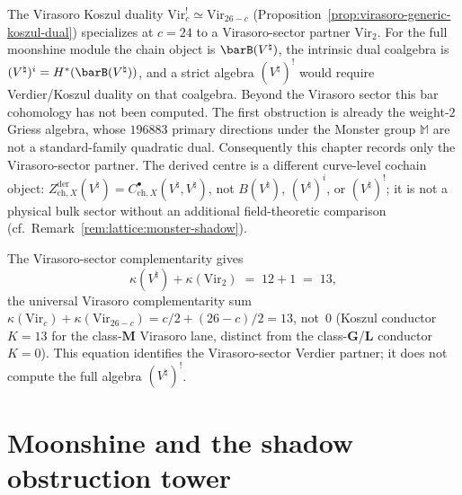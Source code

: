 \begin{remark}%
\label{rem:moonshine-koszul-dual}%
%
The Virasoro Koszul duality $\mathrm{Vir}_c^! \simeq
\mathrm{Vir}_{26-c}$ (Proposition~\ref{prop:virasoro-generic-koszul-dual})
specializes at $c = 24$ to a Virasoro-sector partner
$\mathrm{Vir}_2$. For the full moonshine module the chain object is
$\barB(V^\natural)$, the intrinsic dual coalgebra is
$(V^\natural)^i=H^*(\barB(V^\natural))$, and a strict algebra
$(V^\natural)^!$ would require Verdier/Koszul duality on that
coalgebra. Beyond the Virasoro sector this bar cohomology has not
been computed. The first obstruction is already the weight-$2$
Griess algebra, whose $196883$ primary directions under the Monster
group $\mathbb{M}$ are not a standard-family quadratic dual.
Consequently this chapter records only the Virasoro-sector partner.
The derived centre is a different curve-level cochain object:
$Z_{\mathrm{ch},X}^{\mathrm{der}}(V^\natural)
=C^\bullet_{\mathrm{ch},X}(V^\natural,V^\natural)$, not
$B(V^\natural)$, $(V^\natural)^i$, or $(V^\natural)^!$; it is not a
physical bulk sector without an additional field-theoretic comparison
(cf.\ Remark~\ref{rem:lattice:monster-shadow}).
\end{remark}

The Virasoro-sector complementarity gives
\begin{equation}\label{eq:moonshine-complementarity}
\kappa(V^\natural) + \kappa(\mathrm{Vir}_2)
\;=\;
12 + 1
\;=\;
13,
\end{equation}
the universal Virasoro complementarity sum
$\kappa(\mathrm{Vir}_c) + \kappa(\mathrm{Vir}_{26-c})
= c/2 + (26-c)/2 = 13$, not~$0$ (Koszul conductor $K = 13$ for
the class-$\mathbf{M}$ Virasoro lane, distinct from the
class-$\mathbf{G}$/$\mathbf{L}$ conductor $K = 0$). This equation
identifies the Virasoro-sector Verdier partner; it does not compute
the full algebra $(V^\natural)^!$.

\section{Moonshine and the shadow obstruction tower}


